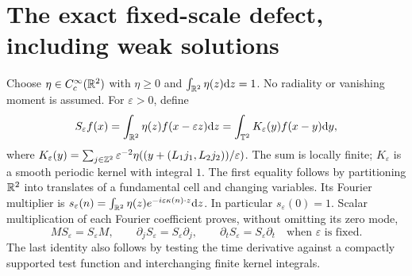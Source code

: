 \section{The exact fixed-scale defect, including weak solutions}
Choose $\eta\in C_c^\infty(\mathbb R^2)$ with $\eta\ge0$ and
$\int_{\mathbb R^2}\eta(z)\mathrm d z=1$. No radiality or vanishing moment is assumed.
For $\varepsilon>0$, define
\begin{equation}\label{ipmc:smoothing}
S_\varepsilon f(x)=\int_{\mathbb R^2}\eta(z)f(x-\varepsilon z)\mathrm d z
=\int_{\mathbb T^2}K_\varepsilon(y)f(x-y)\mathrm d y,
\end{equation}
where
$K_\varepsilon(y)=\sum_{j\in\mathbb Z^2}\varepsilon^{-2}
\eta((y+(L_1j_1,L_2j_2))/\varepsilon)$.
The sum is locally finite; $K_\varepsilon$ is a smooth periodic kernel
with integral $1$. The first equality follows by partitioning $\mathbb R^2$
into translates of a fundamental cell and changing variables.
Its Fourier multiplier is
$s_\varepsilon(n)=\int_{\mathbb R^2}\eta(z)e^{-i\varepsilon\kappa(n)\cdot z}\mathrm d z$.
In particular $s_\varepsilon(0)=1$. Scalar multiplication of each Fourier
coefficient proves, without omitting its zero mode,
\begin{equation}\label{ipmc:commute}
MS_\varepsilon=S_\varepsilon M,\qquad
\partial_jS_\varepsilon=S_\varepsilon\partial_j,\qquad
\partial_tS_\varepsilon=S_\varepsilon\partial_t
\quad\text{when $\varepsilon$ is fixed.}
\end{equation}
The last identity also follows by testing the time derivative against a
compactly supported test function and interchanging finite kernel integrals.


